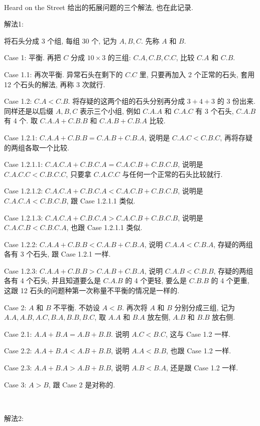 ~

\noindent Heard on the Street 给出的拓展问题的三个解法, 也在此记录.

\noindent 解法1: 

将石头分成 3 个组, 每组 30 个, 记为 $ A, B, C $. 先称 $A$ 和 $B$.

Case 1: 平衡. 再把 $C$ 分成 $ 10\times 3 $ 的三组: $C.A, C.B, C.C$, 比较 $C.A$ 和 $C.B$.

Case 1.1: 再次平衡. 异常石头在剩下的 $C.C$ 里, 只要再加入 2 个正常的石头, 套用 12 个石头的解法, 再称 3 次就行.

Case 1.2: $C.A < C.B$. 将存疑的这两个组的石头分别再分成 $ 3+4+3 $ 的 3 份出来. 同样还是以后缀 $ A,B,C $ 表示三个小组, 例如 $C.A.A$ 和 $C.A.C$ 有 3 个石头, $ C.A.B $有 4 个. 取 $ C.A.A + C.B.B $ 和 $ C.A.B + C.B.A $ 比较.

Case 1.2.1: $ C.A.A + C.B.B = C.A.B + C.B.A $, 说明是 $ C.A.C < C.B.C $, 再将存疑的两组各取一个比较.

Case 1.2.1.1: $ C.A.C.A + C.B.C.A = C.A.C.B + C.B.C.B $, 说明是 $ C.A.C.C < C.B.C.C $, 只要拿 $ C.A.C.C $ 与任何一个正常的石头比较就行.

Case 1.2.1.2: $ C.A.C.A + C.B.C.A < C.A.C.B + C.B.C.B $, 说明是 $ C.A.C.A < C.B.C.B $, 跟 Case 1.2.1.1 类似.

Case 1.2.1.3: $ C.A.C.A + C.B.C.A > C.A.C.B + C.B.C.B $, 说明是 $ C.A.C.B < C.B.C.A $, 也跟 Case 1.2.1.1 类似.

Case 1.2.2: $ C.A.A + C.B.B < C.A.B + C.B.A $, 说明 $ C.A.A < C.B.A $, 存疑的两组各有 3 个石头, 跟 Case 1.2.1 一样.

Case 1.2.3: $ C.A.A + C.B.B > C.A.B + C.B.A $, 说明 $ C.A.B < C.B.B $, 存疑的两组各有 4 个石头, 并且知道要么是 $ C.A.B $ 的 4 个更轻, 要么是 $ C.B.B $ 的 4 个更重, 这跟 12 石头的问题种第一次称量不平衡的情况是一样的. 

Case 2: $A$ 和 $B$ 不平衡. 不妨设 $A < B$. 再次将 $ A $ 和 $ B $ 分别分成三组, 记为 $A.A, A.B, A.C, B.A, B.B, B.C $, 取 $ A.A $ 和 $ B.A $ 放左侧, $ A.B $ 和 $B.B $ 放右侧.

Case 2.1: $ A.A + B.A = A.B + B.B $. 说明 $ A.C < B.C $, 这与 Case 1.2 一样.

Case 2.2: $ A.A + B.A < A.B + B.B $, 说明 $ A.A < B.B $, 也跟 Case 1.2 一样.

Case 2.3: $ A.A + B.A > A.B + B.B $, 说明 $ A.B < B.A $, 还是跟 Case 1.2 一样.

Case 3: $ A > B $, 跟 Case 2 是对称的.

~

\noindent 解法2:

